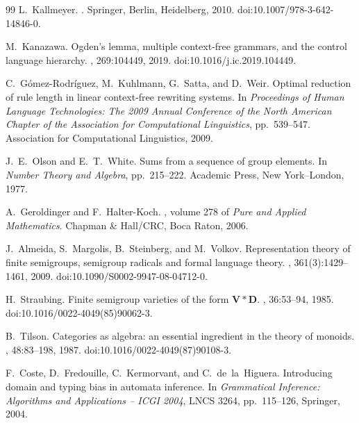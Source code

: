\documentclass[11pt]{article}
\numberwithin{equation}{section}
\theoremstyle{plain}
\theoremstyle{definition}
\theoremstyle{remark}
\theoremstyle{plain}
\begin{document}
\begin{thebibliography}{99}
L.~Kallmeyer.
.
\newblock Springer, Berlin, Heidelberg, 2010.
\newblock doi:10.1007/978-3-642-14846-0.

M.~Kanazawa.
\newblock Ogden's lemma, multiple context-free grammars, and the control language hierarchy.
, 269:104449, 2019.
\newblock doi:10.1016/j.ic.2019.104449.

C.~G\'omez-Rodr\'iguez, M.~Kuhlmann, G.~Satta, and D.~Weir.
\newblock Optimal reduction of rule length in linear context-free rewriting systems.
\newblock In {\em Proceedings of Human Language Technologies: The 2009 Annual
Conference of the North American Chapter of the Association for Computational
Linguistics}, pp.~539--547. Association for Computational Linguistics, 2009.

J.~E.~Olson and E.~T.~White.
\newblock Sums from a sequence of group elements.
\newblock In \emph{Number Theory and Algebra}, pp.~215--222.
Academic Press, New York--London, 1977.

A.~Geroldinger and F.~Halter-Koch.
, volume 278 of {\em Pure and Applied Mathematics}.
\newblock Chapman \& Hall/CRC, Boca Raton, 2006.

J.~Almeida, S.~Margolis, B.~Steinberg, and M.~Volkov.
\newblock Representation theory of finite semigroups, semigroup radicals and
formal language theory.
,
361(3):1429--1461, 2009.
\newblock doi:10.1090/S0002-9947-08-04712-0.

H.~Straubing.
\newblock Finite semigroup varieties of the form $\mathbf V*\mathbf D$.
, 36:53--94, 1985.
\newblock doi:10.1016/0022-4049(85)90062-3.

B.~Tilson.
\newblock Categories as algebra: an essential ingredient in the theory of monoids.
, 48:83--198, 1987.
\newblock doi:10.1016/0022-4049(87)90108-3.

F.~Coste, D.~Fredouille, C.~Kermorvant, and C.~de~la~Higuera.
\newblock Introducing domain and typing bias in automata inference.
\newblock In \emph{Grammatical Inference: Algorithms and Applications -- ICGI 2004},
LNCS 3264, pp.~115--126, Springer, 2004.


\end{thebibliography}
\end{document}
